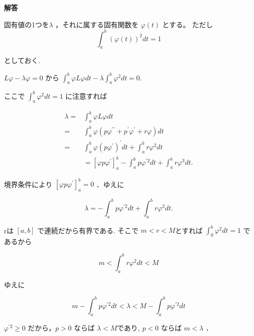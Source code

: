 \documentclass{jsarticle}
\begin{document}
\textbf{解答}

固有値の1つを$\lambda$ ，それに属する固有関数を $\varphi(t)$ とする。 ただし 
$$
\int_{a}^{b}(\varphi(t))^{2} d t=1
$$

としておく.

$
L \varphi-\lambda \varphi=0$ から
$\int_{a}^{b} \varphi L \varphi d t-\lambda \int_{a}^{b} \varphi^{2} d t=0 .$

ここで $\int_{a}^{b} \varphi^{2} d t=1$ に注意すれば

$$
\begin{aligned}
\lambda= & \int_{a}^{b} \varphi L \varphi d t \\
= & \int_{a}^{b} \varphi\left(p \varphi^{\prime \prime}+p^{\prime} \varphi^{\prime}+r \varphi\right) d t \\
= & \int_{a}^{b} \varphi\left(p \varphi^{\prime}\right)^{\prime} d t+\int_{a}^{b} r \varphi^{2} d t \\
&= \left[\varphi p \varphi^{\prime}\right]_{a}^{b}-\int_{a}^{b} p \varphi^{\prime 2} d t+\int_{a}^{b} r \varphi^{3} d t .
\end{aligned}
$$

境界条件により $\left[\varphi p \varphi^{\prime}\right]_{a}^{b}=0$ ．ゆえに

$$
\lambda=-\int_{a}^{b} p \varphi^{\prime 2} d t+\int_{a}^{b} r \varphi^{2} d t .
$$

rは $[a, b]$ で連続だから有界である. そこで $m<r<M$とすれば $\int_{0}^{b} \varphi^{2} d t=1$ であるから

$$
m<\int_{a}^{b} r \varphi^{2} d t<M
$$

ゆえに

$$
m-\int_{a}^{b} p \varphi^{\prime 2} d t<\lambda<M-\int_{a}^{b} p \varphi^{\prime 2} d t
$$

$\varphi^{\prime 2} \geq 0$ だから，$p>0$ ならば $\lambda<M であり, \ p<0$ ならば $m<\lambda$ ．\\

\bigskip
\bigskip
\end{document}
